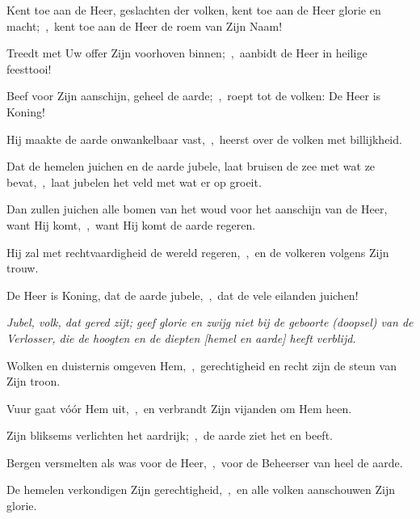 \documentclass[12pt,twoside,a5paper]{article}
\begin{document}
\begin{halfparskip}
  Kent toe aan de Heer, geslachten der volken, kent toe aan de Heer glorie en macht;~\sep\ kent toe aan de Heer de roem van Zijn Naam!

  Treedt met Uw offer Zijn voorhoven binnen;~\sep\ aanbidt de Heer in heilige feesttooi!

  Beef voor Zijn aanschijn, geheel de aarde;~\sep\ roept tot de volken: De Heer is Koning!

  Hij maakte de aarde onwankelbaar vast,~\sep\ heerst over de volken met billijkheid.

  Dat de hemelen juichen en de aarde jubele, laat bruisen de zee met wat ze bevat,~\sep\ laat jubelen het veld met wat er op groeit.

  Dan zullen juichen alle bomen van het woud voor het aanschijn van de Heer, want Hij komt,~\sep\ want Hij komt de aarde regeren.

  Hij zal met rechtvaardigheid de wereld regeren,~\sep\ en de volkeren volgens Zijn trouw.
\end{halfparskip}



\begin{halfparskip}
  De Heer is Koning, dat de aarde jubele,~\sep\ dat de vele eilanden juichen!


   \emph{Jubel, volk, dat gered zijt; geef glorie en zwijg niet bij de geboorte (doopsel) van de Verlosser, die de hoogten en de diepten [hemel en aarde] heeft verblijd.}

  Wolken en duisternis omgeven Hem,~\sep\ gerechtigheid en recht zijn de steun van Zijn troon.

  Vuur gaat vóór Hem uit,~\sep\ en verbrandt Zijn vijanden om Hem heen.

  Zijn bliksems verlichten het aardrijk;~\sep\ de aarde ziet het en beeft.

  Bergen versmelten als was voor de Heer,~\sep\ voor de Beheerser van heel de aarde.

  De hemelen verkondigen Zijn gerechtigheid,~\sep\ en alle volken aanschouwen Zijn glorie.
\end{halfparskip}
\end{document}
